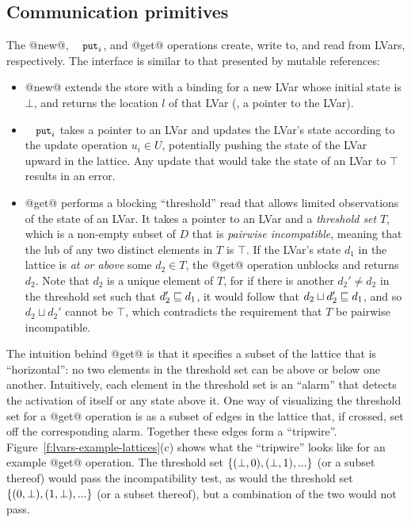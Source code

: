 \subsection{Communication primitives}\label{subsection:lvars-communication-primitives}

The @new@, $\PUTi$, and @get@ operations create, write to, and read
from LVars, respectively. The interface is similar to that presented
by mutable references:

\begin{itemize}
\item @new@ extends the store with a binding for a new LVar whose
  initial state is $\bot$, and returns the location $l$ of that LVar
  (\ie, a pointer to the LVar).
\item $\PUTi$ takes a pointer to an LVar and updates the LVar's state
  according to the update operation $u_i \in U$, potentially pushing the
  state of the LVar upward in the lattice.  Any update that would take
  the state of an LVar to $\top$ results in an error.
\item @get@ performs a blocking ``threshold'' read that allows limited
  observations of the state of an LVar.  It takes a pointer to an LVar
  and a \emph{threshold set} $T$, which is a non-empty subset of $D$
  that is \emph{pairwise incompatible}, meaning that the lub of any
  two distinct elements in $T$ is $\top$.  If the LVar's state $d_1$
  in the lattice is \emph{at or above} some $d_2 \in T$, the @get@
  operation unblocks and returns $d_2$.  Note that $d_2$ is a unique
  element of $T$, for if there is another $d_2' \neq d_2$ in the
  threshold set such that $d_2' \sqsubseteq d_1$, it would follow that
  $d_2 \sqcup d_2' \sqsubseteq d_1$, and so $d_2 \sqcup d_2'$ cannot be
  $\top$, which contradicts the requirement that $T$ be pairwise
  incompatible.
\end{itemize}

The intuition behind @get@ is that it specifies a subset of the
lattice that is ``horizontal'': no two elements in the threshold set
can be above or below one another.  Intuitively, each element in the
threshold set is an ``alarm'' that detects the activation of itself or
any state above it.  One way of visualizing the threshold set for a
@get@ operation is as a subset of edges in the lattice that, if
crossed, set off the corresponding alarm.  Together these edges form a
``tripwire''.  Figure~\ref{f:lvars-example-lattices}(c) shows what the
``tripwire'' looks like for an example @get@ operation.  The
threshold set $\lbrace (\bot, 0), (\bot, 1), ... \rbrace$ (or a subset
thereof) would pass the incompatibility test, as would the threshold
set $\lbrace (0, \bot), (1, \bot), ... \rbrace$ (or a subset thereof), but
a combination of the two would not pass.

